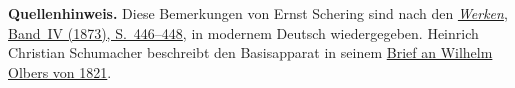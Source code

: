 \par\medskip\begin{small}\noindent\textbf{Quellenhinweis.} Diese Bemerkungen von Ernst Schering sind nach den \href{https://gdz.sub.uni-goettingen.de/download/pdf/PPN236005081/LOG_0046.pdf}{\textit{Werken}, Band~IV (1873), S.~446--448}, in modernem Deutsch wiedergegeben. Heinrich Christian Schumacher beschreibt den Basisapparat in seinem \href{https://doi.org/10.3931/e-rara-111723}{Brief an Wilhelm Olbers von 1821}.\par\end{small}
